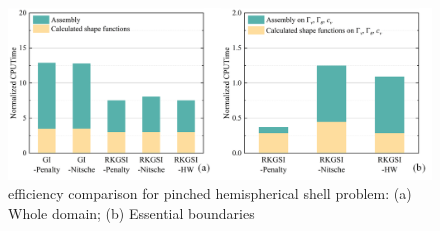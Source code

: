 \begin{figure}[!ht]
\centering
\includegraphics[width=\textwidth]{figures/efficient}
\caption{efficiency comparison for pinched hemispherical shell problem: (a) Whole domain; (b) Essential boundaries}\label{phf3}
\end{figure}


